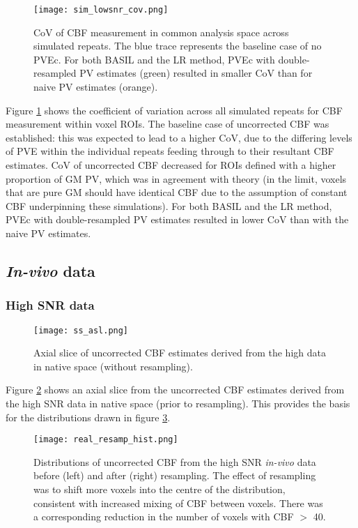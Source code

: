 \begin{figure}[H]
\centering
\texttt{[image: sim\_lowsnr\_cov.png]}
\caption{CoV of CBF measurement in common analysis space across simulated repeats. The blue trace represents the baseline case of no PVEc. For both BASIL and the LR method, PVEc with double-resampled PV estimates (green) resulted in smaller CoV than for naive PV estimates (orange).}
\label{sim_lowsnr_cov}
\end{figure}

Figure \ref{sim_lowsnr_cov} shows the coefficient of variation across all simulated repeats for CBF measurement within voxel ROIs. The baseline case of uncorrected CBF was established: this was expected to lead to a higher CoV, due to the differing levels of PVE within the individual repeats feeding through to their resultant CBF estimates. CoV of uncorrected CBF decreased for ROIs defined with a higher proportion of GM PV, which was in agreement with theory (in the limit, voxels that are pure GM should have identical CBF due to the assumption of constant CBF underpinning these simulations). For both BASIL and the LR method, PVEc with double-resampled PV estimates resulted in lower CoV than with the naive PV estimates.

\subsection{\textit{In-vivo} data}

\subsubsection{High SNR data}

\begin{figure}[H]
\centering
\texttt{[image: ss\_asl.png]}
\caption{Axial slice of uncorrected CBF estimates derived from the high data in native space (without resampling).}
\label{ss_asl}
\end{figure}

Figure \ref{ss_asl} shows an axial slice from the uncorrected CBF estimates derived from the high SNR data in native space (prior to resampling). This provides the basis for the distributions drawn in figure \ref{real_resamp_hist}. 

\begin{figure}[H]
\centering
\texttt{[image: real\_resamp\_hist.png]}
\caption{Distributions of uncorrected CBF from the high SNR \textit{in-vivo} data before (left) and after (right) resampling. The effect of resampling was to shift more voxels into the centre of the distribution, consistent with increased mixing of CBF between voxels. There was a corresponding reduction in the number of voxels with CBF $>$ 40\cbf{}.}
\label{real_resamp_hist}
\end{figure}

